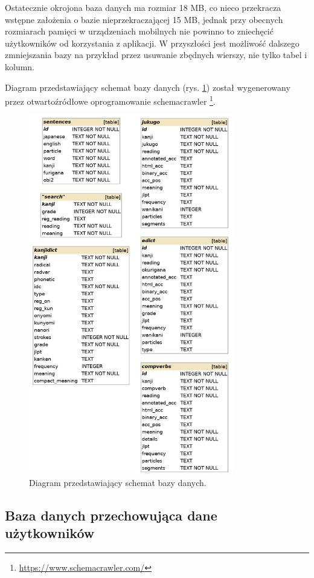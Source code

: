 \documentclass[a4paper,twoside,12pt]{book}
\begin{document}
Ostatecznie okrojona baza danych ma rozmiar 18 MB, co nieco przekracza wstępne założenia o bazie nieprzekraczającej 15 MB, jednak przy obecnych rozmiarach pamięci w urządzeniach mobilnych nie powinno to zniechęcić użytkowników od korzystania z aplikacji. W przyszłości jest możliwość dalszego zmniejszania bazy na przykład przez usuwanie zbędnych wierszy, nie tylko tabel i kolumn.

Diagram przedstawiający schemat bazy danych (rys. \ref{fig:kanjidb}) został wygenerowany przez otwartoźródłowe oprogramowanie schemacrawler \footnote{\url{https://www.schemacrawler.com/}}.
\begin{figure}[]
\centering
\includegraphics[width=0.8\textwidth]{kanjidb}
\caption{Diagram przedstawiający schemat bazy danych.}
\label{fig:kanjidb}
\end{figure}

\subsection{Baza danych przechowująca dane użytkowników}
\end{document}
